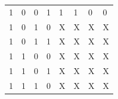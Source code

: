 \begin{center}
\begin{tabular}{|llll|llll|}
1                                                       & 0                                                      & 0                                                      & 1                                                       & 1                                                      & 1                                                      & 0                                                      & 0                                                       \\
1                                                       & 0                                                      & 1                                                      & 0                                                       & X                                                      & X                                                      & X                                                      & X                                                       \\
1                                                       & 0                                                      & 1                                                      & 1                                                       & X                                                      & X                                                      & X                                                      & X                                                       \\
1                                                       & 1                                                      & 0                                                      & 0                                                       & X                                                      & X                                                      & X                                                      & X                                                       \\
1                                                       & 1                                                      & 0                                                      & 1                                                       & X                                                      & X                                                      & X                                                      & X                                                       \\
1                                                       & 1                                                      & 1                                                      & 0                                                       & X                                                      & X                                                      & X                                                      & X                                                       \\

\end{tabular}
\end{center}
